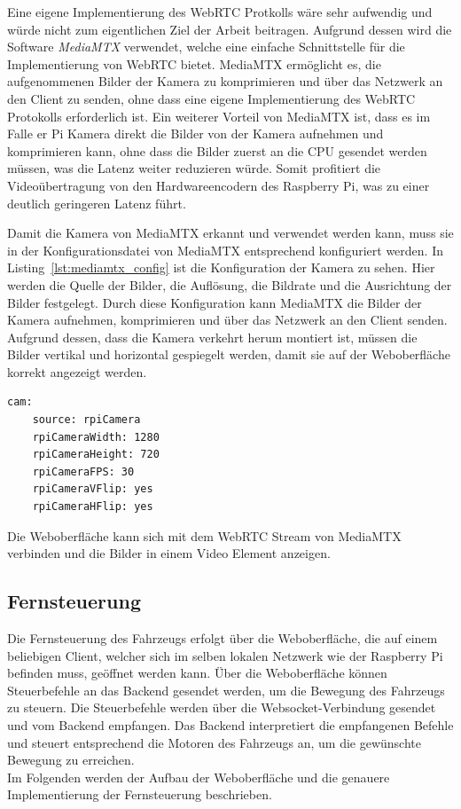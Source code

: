     Eine eigene Implementierung des \ac{WebRTC} Protkolls wäre sehr aufwendig und würde nicht zum eigentlichen Ziel der Arbeit beitragen. Aufgrund dessen wird die Software \emph{MediaMTX} verwendet, welche eine einfache Schnittstelle für die Implementierung von \ac{WebRTC} bietet. MediaMTX ermöglicht es, die aufgenommenen Bilder der Kamera zu komprimieren und über das Netzwerk an den Client zu senden, ohne dass eine eigene Implementierung des \ac{WebRTC} Protokolls erforderlich ist. Ein weiterer Vorteil von MediaMTX ist, dass es im Falle er Pi Kamera direkt die Bilder von der Kamera aufnehmen und komprimieren kann, ohne dass die Bilder zuerst an die \ac{CPU} gesendet werden müssen, was die Latenz weiter reduzieren würde. Somit profitiert die Videoübertragung von den Hardwareencodern des Raspberry Pi, was zu einer deutlich geringeren Latenz führt.

    Damit die Kamera von MediaMTX erkannt und verwendet werden kann, muss sie in der Konfigurationsdatei von MediaMTX entsprechend konfiguriert werden. In Listing~\ref{lst:mediamtx_config} ist die Konfiguration der Kamera zu sehen. Hier werden die Quelle der Bilder, die Auflösung, die Bildrate und die Ausrichtung der Bilder festgelegt. Durch diese Konfiguration kann MediaMTX die Bilder der Kamera aufnehmen, komprimieren und über das Netzwerk an den Client senden. Aufgrund dessen, dass die Kamera verkehrt herum montiert ist, müssen die Bilder vertikal und horizontal gespiegelt werden, damit sie auf der Weboberfläche korrekt angezeigt werden.

    \begin{lstlisting}[caption={Konfiguration der Kamera in der \emph{MediaMTX} Konfigurationsdatei}, label={lst:mediamtx_config}]
cam:
    source: rpiCamera
    rpiCameraWidth: 1280
    rpiCameraHeight: 720
    rpiCameraFPS: 30
    rpiCameraVFlip: yes
    rpiCameraHFlip: yes
    \end{lstlisting}

    Die Weboberfläche kann sich mit dem \ac{WebRTC} Stream von MediaMTX verbinden und die Bilder in einem Video Element anzeigen. 

    \subsection{Fernsteuerung}
    Die Fernsteuerung des Fahrzeugs erfolgt über die Weboberfläche, die auf einem beliebigen Client, welcher sich im selben lokalen Netzwerk wie der Raspberry Pi befinden muss, geöffnet werden kann. Über die Weboberfläche können Steuerbefehle an das Backend gesendet werden, um die Bewegung des Fahrzeugs zu steuern. Die Steuerbefehle werden über die Websocket-Verbindung gesendet und vom Backend empfangen. Das Backend interpretiert die empfangenen Befehle und steuert entsprechend die Motoren des Fahrzeugs an, um die gewünschte Bewegung zu erreichen. \\
    Im Folgenden werden der Aufbau der Weboberfläche und die genauere Implementierung der Fernsteuerung beschrieben.

